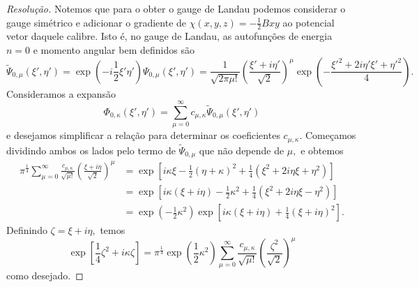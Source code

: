 \begin{proof}[Resolução]
   Notemos que para o obter o gauge de Landau podemos considerar o gauge simétrico e adicionar o gradiente de \(\chi(x,y,z) = -\frac12 B xy\) ao potencial vetor daquele calibre. Isto é, no gauge de Landau, as autofunções de energia \(n = 0\) e momento angular bem definidos são
   \begin{equation*}
      \tilde{\Psi}_{0, \mu}(\xi',\eta') = \exp\left(-i \frac12\xi'\eta'\right) \Psi_{0,\mu}(\xi', \eta') = \frac{1}{\sqrt{2\pi \mu!}} \left(\frac{\xi' + i \eta'}{\sqrt{2}}\right)^\mu \exp\left(-\frac{{\xi'}^2 + 2 i \eta' \xi' +  {\eta'}^2}{4}\right).
   \end{equation*}
   Consideramos a expansão
   \begin{equation*}
      \Phi_{0,\kappa}(\xi', \eta') = \sum_{\mu = 0}^\infty c_{\mu, \kappa}\tilde{\Psi}_{0,\mu}(\xi', \eta')
   \end{equation*}
   e desejamos simplificar a relação para determinar os coeficientes \(c_{\mu,\kappa}.\) Começamos dividindo ambos os lados pelo termo de \(\tilde{\Psi}_{0,\mu}\) que não depende de \(\mu,\) e obtemos
   \begin{align*}
      \pi^{\frac14} \sum_{\mu = 0}^{\infty} \frac{c_{\mu,\kappa}}{\sqrt{\mu!}}\left(\frac{\xi + i \eta}{\sqrt{2}}\right)^\mu 
      &= \exp\left[i \kappa \xi - \frac12 (\eta + \kappa)^2 + \frac14( \xi^2 + 2 i \eta \xi + \eta^2)\right]\\
      &= \exp\left[i \kappa (\xi + i \eta) - \frac12 \kappa^2 + \frac14 (\xi^2 + 2i \eta \xi - \eta^2)\right]\\
      &= \exp\left(-\frac12 \kappa^2\right) \exp\left[i \kappa (\xi + i \eta) + \frac14 (\xi + i \eta)^2\right].
   \end{align*}
   Definindo \(\zeta = \xi + i \eta,\) temos
   \begin{equation*}
      \exp\left[\frac14 \zeta^2 + i \kappa \zeta\right] = \pi^{\frac14} \exp\left(\frac12 \kappa^2\right) \sum_{\mu = 0}^\infty \frac{c_{\mu, \kappa}}{\sqrt{\mu!}} \left(\frac{\zeta^2}{\sqrt{2}}\right)^\mu
   \end{equation*}
   como desejado.
\end{proof}
